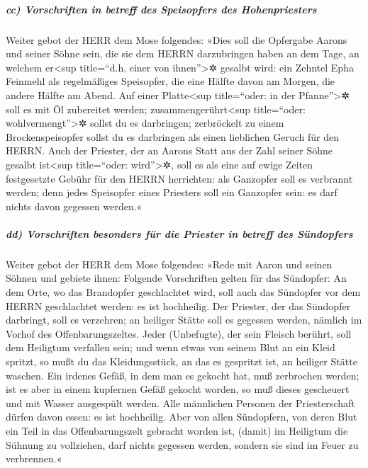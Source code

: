\hypertarget{cc-vorschriften-in-betreff-des-speisopfers-des-hohenpriesters}{%
\subparagraph{cc) Vorschriften in betreff des Speisopfers des
Hohenpriesters}\label{cc-vorschriften-in-betreff-des-speisopfers-des-hohenpriesters}}

Weiter gebot der HERR dem Mose folgendes:
»Dies soll die Opfergabe Aarons und seiner Söhne sein,
die sie dem HERRN darzubringen haben an dem Tage, an welchem
er\textless sup title=``d.h. einer von ihnen''\textgreater✲ gesalbt
wird: ein Zehntel Epha Feinmehl als regelmäßiges Speisopfer, die eine
Hälfte davon am Morgen, die andere Hälfte am Abend. Auf
einer Platte\textless sup title=``oder: in der Pfanne''\textgreater✲
soll es mit Öl zubereitet werden; zusammengerührt\textless sup
title=``oder: wohlvermengt''\textgreater✲ sollst du es darbringen;
zerbröckelt zu einem Brockenspeisopfer sollst du es darbringen als einen
lieblichen Geruch für den HERRN. Auch der Priester, der
an Aarons Statt aus der Zahl seiner Söhne gesalbt ist\textless sup
title=``oder: wird''\textgreater✲, soll es als eine auf ewige Zeiten
festgesetzte Gebühr für den HERRN herrichten: als Ganzopfer soll es
verbrannt werden; denn jedes Speisopfer eines Priesters
soll ein Ganzopfer sein: es darf nichts davon gegessen werden.«

\hypertarget{dd-vorschriften-besonders-fuxfcr-die-priester-in-betreff-des-suxfcndopfers}{%
\subparagraph{dd) Vorschriften besonders für die Priester in betreff des
Sündopfers}\label{dd-vorschriften-besonders-fuxfcr-die-priester-in-betreff-des-suxfcndopfers}}

Weiter gebot der HERR dem Mose folgendes:
»Rede mit Aaron und seinen Söhnen und gebiete ihnen:
Folgende Vorschriften gelten für das Sündopfer: An dem Orte, wo das
Brandopfer geschlachtet wird, soll auch das Sündopfer vor dem HERRN
geschlachtet werden: es ist hochheilig. Der Priester, der
das Sündopfer darbringt, soll es verzehren; an heiliger Stätte soll es
gegessen werden, nämlich im Vorhof des Offenbarungszeltes.
Jeder (Unbefugte), der sein Fleisch berührt, soll dem
Heiligtum verfallen sein; und wenn etwas von seinem Blut an ein Kleid
spritzt, so mußt du das Kleidungsstück, an das es gespritzt ist, an
heiliger Stätte waschen. Ein irdenes Gefäß, in dem man es
gekocht hat, muß zerbrochen werden; ist es aber in einem kupfernen Gefäß
gekocht worden, so muß dieses gescheuert und mit Wasser ausgespült
werden. Alle männlichen Personen der Priesterschaft
dürfen davon essen: es ist hochheilig. Aber von allen
Sündopfern, von deren Blut ein Teil in das Offenbarungszelt gebracht
worden ist, (damit) im Heiligtum die Sühnung zu vollziehen, darf nichts
gegessen werden, sondern sie sind im Feuer zu verbrennen.«


